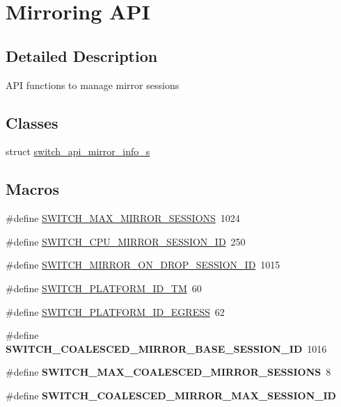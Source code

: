 \hypertarget{group__Mirror}{\section{Mirroring A\+P\+I}
\label{group__Mirror}
}


\subsection{Detailed Description}
A\+P\+I functions to manage mirror sessions \subsection*{Classes}
\begin{DoxyCompactItemize}
\item 
struct \hyperlink{structswitch__api__mirror__info__s}{switch\+\_\+api\+\_\+mirror\+\_\+info\+\_\+s}
\end{DoxyCompactItemize}
\subsection*{Macros}
\begin{DoxyCompactItemize}
\item 
\#define \hyperlink{group__Mirror_gad8fd0aedd4d812e90c888043344acb53}{S\+W\+I\+T\+C\+H\+\_\+\+M\+A\+X\+\_\+\+M\+I\+R\+R\+O\+R\+\_\+\+S\+E\+S\+S\+I\+O\+N\+S}~1024
\item 
\#define \hyperlink{group__Mirror_ga9569fbb2f576f139948976594d716974}{S\+W\+I\+T\+C\+H\+\_\+\+C\+P\+U\+\_\+\+M\+I\+R\+R\+O\+R\+\_\+\+S\+E\+S\+S\+I\+O\+N\+\_\+\+I\+D}~250
\item 
\#define \hyperlink{group__Mirror_ga4688aeae07e273f0e3fbbfdc0ea3bf36}{S\+W\+I\+T\+C\+H\+\_\+\+M\+I\+R\+R\+O\+R\+\_\+\+O\+N\+\_\+\+D\+R\+O\+P\+\_\+\+S\+E\+S\+S\+I\+O\+N\+\_\+\+I\+D}~1015
\item 
\#define \hyperlink{group__Mirror_gafb1a3a1ab2b2196a75e65f155f3e1cf0}{S\+W\+I\+T\+C\+H\+\_\+\+P\+L\+A\+T\+F\+O\+R\+M\+\_\+\+I\+D\+\_\+\+T\+M}~60
\item 
\#define \hyperlink{group__Mirror_ga9698f60bd8df886af3705bf119b66869}{S\+W\+I\+T\+C\+H\+\_\+\+P\+L\+A\+T\+F\+O\+R\+M\+\_\+\+I\+D\+\_\+\+E\+G\+R\+E\+S\+S}~62
\item 
\hypertarget{group__Mirror_gaef6f8bf34bc24a840d36b296491d76f2}{\#define {\bfseries S\+W\+I\+T\+C\+H\+\_\+\+C\+O\+A\+L\+E\+S\+C\+E\+D\+\_\+\+M\+I\+R\+R\+O\+R\+\_\+\+B\+A\+S\+E\+\_\+\+S\+E\+S\+S\+I\+O\+N\+\_\+\+I\+D}~1016}\label{group__Mirror_gaef6f8bf34bc24a840d36b296491d76f2}

\item 
\hypertarget{group__Mirror_ga72e9206edba01256f8032d75e96e6b80}{\#define {\bfseries S\+W\+I\+T\+C\+H\+\_\+\+M\+A\+X\+\_\+\+C\+O\+A\+L\+E\+S\+C\+E\+D\+\_\+\+M\+I\+R\+R\+O\+R\+\_\+\+S\+E\+S\+S\+I\+O\+N\+S}~8}\label{group__Mirror_ga72e9206edba01256f8032d75e96e6b80}

\item 
\#define {\bfseries S\+W\+I\+T\+C\+H\+\_\+\+C\+O\+A\+L\+E\+S\+C\+E\+D\+\_\+\+M\+I\+R\+R\+O\+R\+\_\+\+M\+A\+X\+\_\+\+S\+E\+S\+S\+I\+O\+N\+\_\+\+I\+D}
\end{DoxyCompactItemize}
